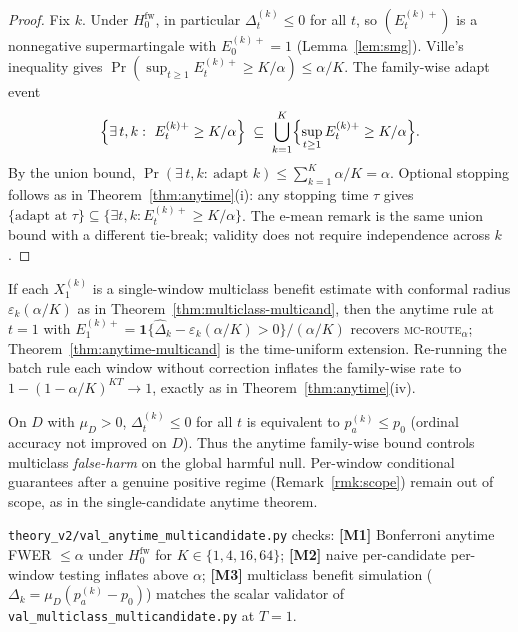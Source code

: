 \begin{proof}
Fix $k$.  Under $H_0^{\mathrm{fw}}$, in particular $\Delta_t^{(k)}\le0$ for all $t$, so
$(E_t^{(k)+})$ is a nonnegative supermartingale with $E_0^{(k)+}=1$
(Lemma~\ref{lem:smg}).  Ville's inequality gives
$\Pr(\sup_{t\ge1}E_t^{(k)+}\ge K/\alpha)\le\alpha/K$.  The family-wise adapt event
\[
  \Bigl\{\exists\,t,k:\ E_t^{(k)+}\ge K/\alpha\Bigr\}
  \;\subseteq\;
  \bigcup_{k=1}^K\Bigl\{\sup_{t\ge1}E_t^{(k)+}\ge K/\alpha\Bigr\}.
\]
By the union bound,
$\Pr(\exists\,t,k:\ \text{adapt }k)\le\sum_{k=1}^K\alpha/K=\alpha$.
Optional stopping follows as in Theorem~\ref{thm:anytime}(i): any stopping time $\tau$ gives
$\{\text{adapt at }\tau\}\subseteq\{\exists t,k:E_t^{(k)+}\ge K/\alpha\}$.
The e-mean remark is the same union bound with a different tie-break; validity does not
require independence across $k$.
\end{proof}

\begin{corollary}[Batch multiclass routing as the $T{=}1$ slice]\label{cor:anytime-mc-batch}
If each $X_1^{(k)}$ is a single-window multiclass benefit estimate with conformal radius
$\varepsilon_k(\alpha/K)$ as in Theorem~\ref{thm:multiclass-multicand}, then the anytime rule
at $t=1$ with $E_1^{(k)+}=\mathbf 1\{\hat\Delta_k-\varepsilon_k(\alpha/K)>0\}/(\alpha/K)$
recovers \textsc{mc-route}$_\alpha$; Theorem~\ref{thm:anytime-multicand} is the time-uniform
extension.  Re-running the batch rule each window without correction inflates the family-wise
rate to $1-(1-\alpha/K)^{KT}\to1$, exactly as in Theorem~\ref{thm:anytime}(iv).
\end{corollary}

\begin{remark}\label{rmk:anytime-mc-harm}
On $D$ with $\mu_D>0$, $\Delta_t^{(k)}\le0$ for all $t$ is equivalent to
$p_a^{(k)}\le p_0$ (ordinal accuracy not improved on $D$).  Thus the anytime family-wise bound
controls multiclass \emph{false-harm} on the global harmful null.  Per-window conditional
guarantees after a genuine positive regime (Remark~\ref{rmk:scope}) remain out of scope, as in
the single-candidate anytime theorem.
\end{remark}

\begin{remark}\label{rmk:anytime-mc-val}
\texttt{theory\_v2/val\_anytime\_multicandidate.py} checks:
\textbf{[M1]} Bonferroni anytime FWER $\le\alpha$ under $H_0^{\mathrm{fw}}$ for
$K\in\{1,4,16,64\}$;
\textbf{[M2]} naive per-candidate per-window testing inflates above $\alpha$;
\textbf{[M3]} multiclass benefit simulation ($\Delta_k=\mu_D(p_a^{(k)}-p_0)$) matches the
scalar validator of \texttt{val\_multiclass\_multicandidate.py} at $T{=}1$.
\end{remark}
